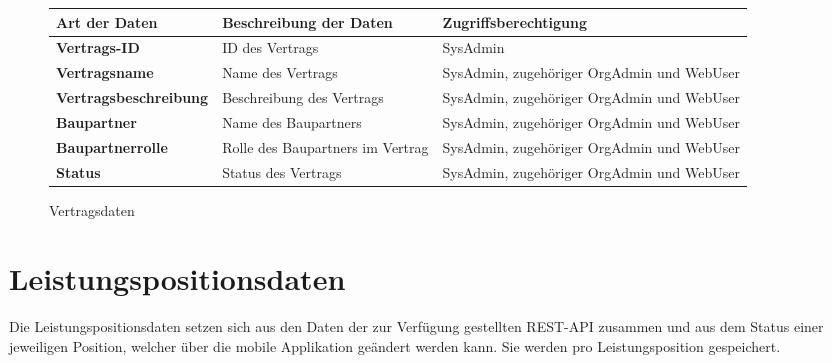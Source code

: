 \begin{figure}[h]
	\centering
	\begin{tabularx}{\textwidth}{| X || X | X |}
        \hline
		\textbf{Art der Daten} & \textbf{Beschreibung der Daten} & \textbf{Zugriffsberechtigung} \\ \hline \hline
		\textbf{Vertrags-ID} & ID des Vertrags & SysAdmin \\ \hline
		\textbf{Vertragsname} & Name des Vertrags & SysAdmin, zugehöriger OrgAdmin und WebUser \\ \hline
        \textbf{Vertragsbeschreibung} & Beschreibung des Vertrags & SysAdmin, zugehöriger OrgAdmin und WebUser \\ \hline
        \textbf{Baupartner} & Name des Baupartners & SysAdmin, zugehöriger OrgAdmin und WebUser \\ \hline
        \textbf{Baupartnerrolle} & Rolle des Baupartners im Vertrag & SysAdmin, zugehöriger OrgAdmin und WebUser \\ \hline
        \textbf{Status} & Status des Vertrags & SysAdmin, zugehöriger OrgAdmin und WebUser \\ \hline
	\end{tabularx}
	\caption{Vertragsdaten}
	\label{fig:Vertragsdaten}
\end{figure}

\newpage

\section{Leistungspositionsdaten}

Die Leistungspositionsdaten setzen sich aus den Daten der zur Verf\"ugung gestellten REST-API zusammen und aus dem Status einer jeweiligen Position, welcher über die mobile Applikation geändert werden kann.
Sie werden pro Leistungsposition gespeichert.

